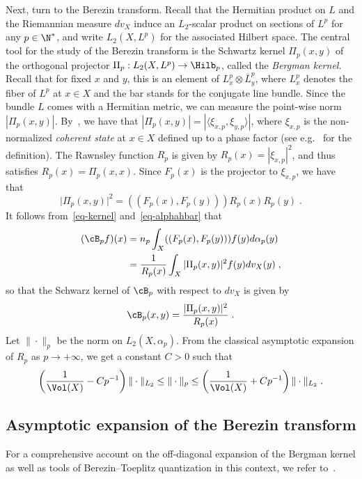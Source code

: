 Next, turn to the Berezin transform. Recall that the Hermitian product on $L$ and the Riemannian measure $dv_X$ induce an $L_2$-scalar product on sections of $L^p$ for any $p\in\N^*$, and write $L_2(X,L^p)$ for the associated Hilbert space. The central tool for the study of the Berezin transform is the Schwartz kernel $\Pi_p(x,y)$ of the orthogonal projector $\Pi_p:L_2(X,L^p) \to \Hilb_{p}$, called the \emph{Bergman kernel}. Recall that for fixed $x$ and $y$, this is an element of $L^p_x \otimes \bar{L}^p_y$, where $L^p_x$ denotes the fiber of $L^p$ at $x \in X$ and the bar stands for the conjugate line bundle. Since the bundle $L$ comes with a Hermitian metric, we can measure the point-wise norm $|\Pi_p(x,y)|$. By~\cite[Corollary~9.1.4$\MK$(2)]{LF}, we have that $|\Pi_p(x,y)| = |\langle \xi_{x,p},\xi_{y,p} \rangle|$, where $\xi_{x,p}$ is the non-normalized \emph{coherent state} at $x\in X$ defined up to a phase factor (see e.g.~\cite{CP,LF} for the definition). The Rawnsley function $R_p$ is given by $R_p(x) = |\xi_{x,p}|^2$, and thus satisfies $R_p(x)=\Pi_p(x,x)$. Since $F_p(x)$ is the projector to $\xi_{x,p}$, we have that
\[
\big|\Pi_p(x,y)\big|^2 = ((F_p(x),F_p(y))) R_p(x)R_p(y)\;.
\]
It follows from~\eqref{eq-kernel} and~\eqref{eq-alphahbar} that
\begin{equation}\label{Bpfla}
\begin{aligned}
(\cB_p f)(x) &= n_p \int_X ((F_p(x),F_p(y)))f(y) d\alpha_p(y)\\
&= \frac{1}{R_p(x)} \int_X |\Pi_p(x,y)|^2 f(y) dv_X(y)\;,
\end{aligned}
\end{equation}
so that the Schwarz kernel of $\cB_p$ with respect to $dv_X$ is given by
\begin{equation}\label{eq-schwarzkernelberezin}
\cB_p(x,y)= \frac{|\Pi_p(x,y)|^2}{R_p(x)}\;.
\end{equation}
Let $\|\cdot\|_p$ be the norm on $L_2(X,\alpha_p)$. From the classical asymptotic expansion of $R_p$ as $p \to +\infty$, we get a constant $C>0$ such that
\begin{equation}\label{diagexp}
\left(\frac{1}{\Vol(X)}- Cp^{-1}\right)\|\cdot\|_{L_2}
\leq\|\cdot\|_p
\leq\left(\frac{1}{\Vol(X)}+ Cp^{-1}\right)\|\cdot\|_{L_2}\;.
\end{equation}

\subsection{Asymptotic expansion of the Berezin transform}
For a comprehensive account on the off-diagonal expansion of the Bergman kernel as well as tools of Berezin--Toeplitz quantization in this context, we refer to~\cite{MM07}.

